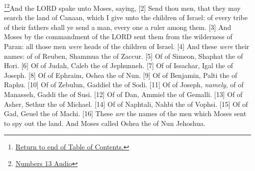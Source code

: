 \footnote{\textcolor[cmyk]{0.99998,1,0,0}{\hyperlink{TOC}{Return to end of Table of Contents.}}}\footnote{\href{https://audiobible.com/bible/numbers_13.html}{\textcolor[cmyk]{0.99998,1,0,0}{Numbers 13 Audio}}}\textcolor[cmyk]{0.99998,1,0,0}{And the LORD spake unto Moses, saying,}
[2] \textcolor[cmyk]{0.99998,1,0,0}{Send thou men, that they may search the land of Canaan, which I give unto the children of Israel: of every tribe of their fathers shall ye send a man, every one a ruler among them.}
[3] \textcolor[cmyk]{0.99998,1,0,0}{And Moses by the commandment of the LORD sent them from the wilderness of Paran: all those men \emph{were} heads of the children of Israel.}
[4] \textcolor[cmyk]{0.99998,1,0,0}{And these \emph{were} their names: of  of Reuben, Shammua the  of Zaccur.}
[5] \textcolor[cmyk]{0.99998,1,0,0}{Of  of Simeon, Shaphat the  of Hori.}
[6] \textcolor[cmyk]{0.99998,1,0,0}{Of  of Judah, Caleb the  of Jephunneh.}
[7] \textcolor[cmyk]{0.99998,1,0,0}{Of  of Issachar, Igal the  of Joseph.}
[8] \textcolor[cmyk]{0.99998,1,0,0}{Of  of Ephraim, Oshea the  of Nun.}
[9] \textcolor[cmyk]{0.99998,1,0,0}{Of  of Benjamin, Palti the  of Raphu.}
[10] \textcolor[cmyk]{0.99998,1,0,0}{Of  of Zebulun, Gaddiel the  of Sodi.}
[11] \textcolor[cmyk]{0.99998,1,0,0}{Of  of Joseph, \emph{namely}, of  of Manasseh, Gaddi the  of Susi.}
[12] \textcolor[cmyk]{0.99998,1,0,0}{Of  of Dan, Ammiel the  of Gemalli.}
[13] \textcolor[cmyk]{0.99998,1,0,0}{Of  of Asher, Sethur the  of Michael.}
[14] \textcolor[cmyk]{0.99998,1,0,0}{Of  of Naphtali, Nahbi the  of Vophsi.}
[15] \textcolor[cmyk]{0.99998,1,0,0}{Of  of Gad, Geuel the  of Machi.}
[16] \textcolor[cmyk]{0.99998,1,0,0}{These \emph{are} the names of the men which Moses sent to spy out the land. And Moses called Oshea the  of Nun Jehoshua.}\\
